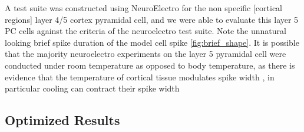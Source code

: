 A test suite was constructed using NeuroElectro for the non specific [cortical regions] layer 4/5 cortex pyramidal cell, and we were able to evaluate this layer 5 PC cells against the criteria of the neuroelectro test suite. Note the unnatural looking brief spike duration of the model cell spike  \ref{fig:brief_shape}. It is possible that the majority neuroelectro experiments on the layer 5 pyramidal cell were conducted under room temperature as opposed to body temperature, as there is evidence that the temperature of cortical tissue modulates spike width \cite{goldin2017temperature}, in particular cooling can contract their spike width

%



\subsection{Optimized Results}
\begin{table}[ht]
\centering
{}
\caption{observations, predictions and Z-scores pertaining to the NeuronUnit optimized Layer 5 Pyramidal Neuron}
\label{tab:l5pc_table}
\end{table}

